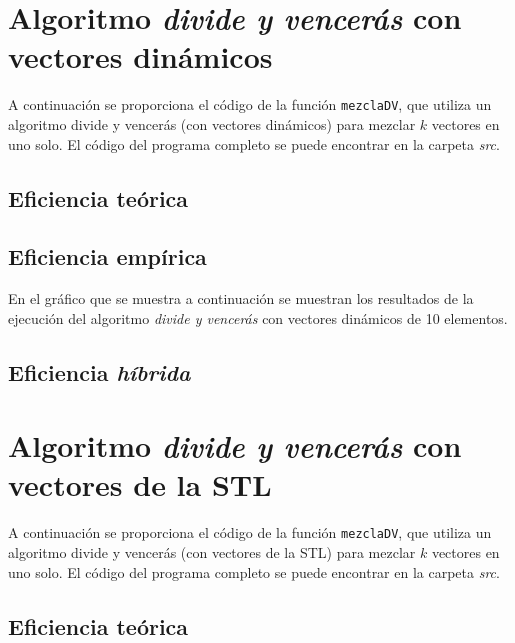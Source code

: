 \documentclass[11pt]{article}
\begin{document}
\section*{Algoritmo \textit{divide y vencerás} con vectores dinámicos}


A continuación se proporciona el código de la función \texttt{mezclaDV},
que utiliza un algoritmo divide y vencerás (con vectores dinámicos) para mezclar $k$ vectores en uno solo. El
código del programa completo se puede encontrar en la carpeta \textit{src}.\\



\subsection*{Eficiencia teórica}

\subsection*{Eficiencia empírica}

En el gráfico que se muestra a continuación se muestran los resultados de la
ejecución del algoritmo \textit{divide y vencerás} con vectores dinámicos de 10 elementos.

\begin{center}
	
\end{center}

\subsection*{Eficiencia \textit{híbrida}}

\section*{Algoritmo \textit{divide y vencerás} con vectores de la STL}


A continuación se proporciona el código de la función \texttt{mezclaDV},
que utiliza un algoritmo divide y vencerás (con vectores de la STL) para mezclar $k$ vectores en uno solo. El
código del programa completo se puede encontrar en la carpeta \textit{src}.



\subsection*{Eficiencia teórica}
\end{document}
